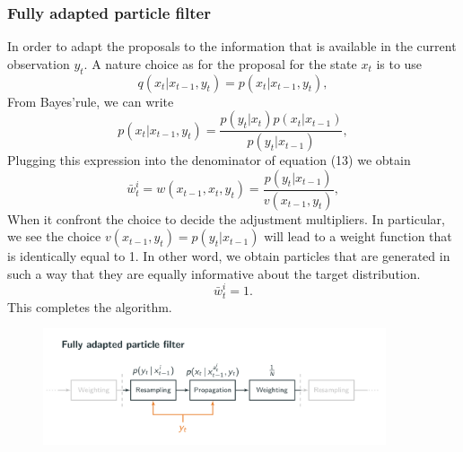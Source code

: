 \documentclass[11pt,oneside,a4paper]{article}
\begin{document}
\subsubsection{Fully adapted particle filter}
In order to adapt the proposals to the information that is available in the current observation $y_{t} $. A nature choice as for the proposal for the state $x_{t} $ is to use
\begin{equation}
  q(x_{t}|x_{t-1}, y_{t}) = p(x_{t}|x_{t-1}, y_{t}),
\end{equation}
From Bayes'rule, we can write
\begin{equation}
  p(x_{t}|x_{t-1}, y_{t}) = \frac{p(y_{t}|x_{t}) p(x_{t}|x_{t-1})}{p(y_{t}|x_{t-1})},
\end{equation}
Plugging this expression into the denominator of equation (13) we obtain
\begin{equation}
\bar{w}_{t}^{i} = w(x_{t-1}, x_{t}, y_{t}) = \frac{p(y_{t} | x_{t-1})}{v(x_{t-1}, y_{t})},
\end{equation}
When it confront the choice to decide the adjustment multipliers. In particular, we see the choice $v(x_{t-1}, y_{t}) = p(y_{t}|x_{t-1}) $ will lead to a weight function that is identically equal to 1. In other word, we obtain particles that are generated in such a way that they are equally informative about the
target distribution.
\begin{equation}
  \bar{w}_{t}^{i} = 1.
\end{equation}
This completes the algorithm.
\begin{figure}[H]
  \begin{center}
  \includegraphics[width=0.9\textwidth]{./source/7.png}
  \caption{}
  \label{}
  \end{center}
\end{figure}
\end{document}
